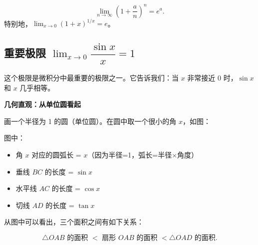 \documentclass[fontset=fandol]{ctexart}
\newenvironment{custom}[1]{\par\noindent\textbf{#1}\quad}{\par\vspace{0.8em}}
\begin{document}
\begin{theorem}[第一个重要极限的推广]
\[
\lim_{n\to\infty} \left(1 + \dfrac{a}{n}\right)^n = e^a.
\]
特别地，\(\lim_{x\to 0} (1+x)^{1/x} = e\)。
\end{theorem}

\subsection{重要极限 \(\lim_{x \to 0} \dfrac{\sin x}{x} = 1\)}

这个极限是微积分中最重要的极限之一。它告诉我们：当 \(x\) 非常接近 0 时，\(\sin x\) 和 \(x\) 几乎相等。

\begin{custom}{几何直观：从单位圆看起}

画一个半径为 1 的圆（单位圆）。在圆中取一个很小的角 \(x\)，如图：

\begin{center}
\end{center}

图中：
\begin{itemize}
\item 角 \(x\) 对应的圆弧长 = \(x\)（因为半径=1，弧长=半径×角度）
\item 垂线 \(BC\) 的长度 = \(\sin x\)
\item 水平线 \(AC\) 的长度 = \(\cos x\)
\item 切线 \(AD\) 的长度 = \(\tan x\)
\end{itemize}

从图中可以看出，三个面积之间有如下关系：

\[
\triangle OAB \text{ 的面积 } < \text{ 扇形 } OAB \text{ 的面积 } < \triangle OAD \text{ 的面积}.
\]

\end{custom}
\end{document}

